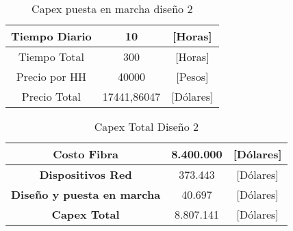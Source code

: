 \begin{table}[H]
\begin{tabular}{ccc}
\multicolumn{1}{|c|}{Tiempo Diario} & \multicolumn{1}{c|}{10} & \multicolumn{1}{c|}{{[}Horas{]}} \\ \hline
\multicolumn{1}{|c|}{Tiempo Total} & \multicolumn{1}{c|}{300} & \multicolumn{1}{c|}{{[}Horas{]}} \\ \hline
\multicolumn{1}{|c|}{Precio por HH} & \multicolumn{1}{c|}{40000} & \multicolumn{1}{c|}{{[}Pesos{]}} \\ \hline
\multicolumn{1}{|c|}{Precio Total} & \multicolumn{1}{c|}{17441,86047} & \multicolumn{1}{c|}{{[}Dólares{]}} \\ \hline
\end{tabular}
\caption{Capex puesta en marcha diseño 2}
\label{tab:my-table}
\end{table}

\begin{table}[H]
\begin{tabular}{|c|c|c|}
\hline
\textbf{Costo Fibra} & 8.400.000 & [Dólares] \\ \hline
\textbf{Dispositivos Red} & 373.443 & [Dólares] \\ \hline
\textbf{Diseño y puesta en marcha} & 40.697 & [Dólares] \\ \hline
\textbf{Capex Total} & 8.807.141  & [Dólares]\\ \hline
\end{tabular}
\caption{Capex Total Diseño 2}
\label{tab:my-table}
\end{table}
